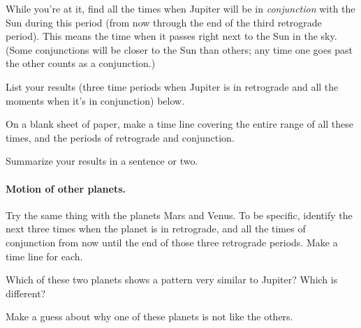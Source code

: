 While you're at it, find all the times 
when Jupiter will be
in \textit{conjunction} with the Sun during this period (from
now through the end of the third retrograde period). 
This means the time when
it passes right next to the Sun in the sky. (Some conjunctions will be closer
to the Sun than others; any time one goes past the other counts as a
conjunction.)

List your results (three time periods when Jupiter is in retrograde
and all the moments when it's in conjunction) below.

\vskip 3in

On a blank sheet of paper, make a time line covering the entire
range of all these times, and the periods of retrograde and conjunction.

Summarize your results in a sentence or two.

\vskip 1in

\paragraph{Motion of other planets.}
Try the same thing with the planets Mars and Venus.
To be specific, identify the next three times when the planet is 
in retrograde, and all the times of conjunction from now until the end of those
three
retrograde periods. Make a time line for each.

\vskip 5in

Which of these two planets shows a pattern very similar to Jupiter?
Which is different?

\vskip 1in

Make a guess about why one of these planets is not like the others.

\vskip 1in



